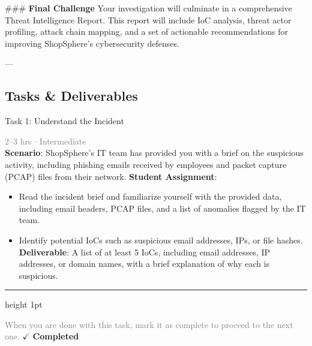 \documentclass[10pt,a4paper]{article}
\begin{document}
\#\#\# \textbf{Final Challenge}
Your investigation will culminate in a comprehensive Threat Intelligence Report. This report will include IoC analysis, threat actor profiling, attack chain mapping, and a set of actionable recommendations for improving ShopSphere’s cybersecurity defenses.

---

\subsection*{Tasks \& Deliverables}

\begin{taskbox}{Task 1: Understand the Incident}

    {\small \textcolor{gray}{2--3 hrs $\cdot$ Intermediate}}\\[12pt]

    \textbf{Scenario}: ShopSphere’s IT team has provided you with a brief on the suspicious activity, including phishing emails received by employees and packet capture (PCAP) files from their network.  
\textbf{Student Assignment}: 
\begin{itemize}
    \item Read the incident brief and familiarize yourself with the provided data, including email headers, PCAP files, and a list of anomalies flagged by the IT team.
    \item Identify potential IoCs such as suspicious email addresses, IPs, or file hashes.  
\textbf{Deliverable}: A list of at least 5 IoCs, including email addresses, IP addresses, or domain names, with a brief explanation of why each is suspicious.\par
\end{itemize}

    \vspace{16pt}

    \textcolor{cardBorder}{\hrule height 1pt}\vspace{8pt}

    \small \textcolor{gray}{When you are done with this task, mark it as complete to proceed to the next one.} \hfill \textbf{\textcolor{brandDark}{$\checkmark$ Completed}}

\end{taskbox}
\end{document}

